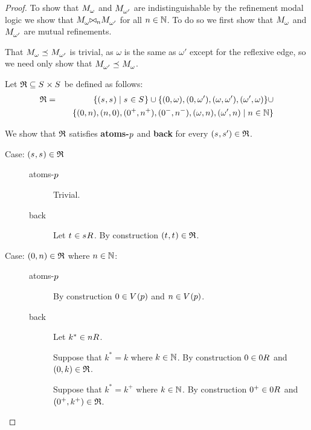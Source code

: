 \begin{proof}
To show that $\kPModel{\omega}$ and $\kPModel{\omega'}$ are indistinguishable by the refinement modal logic we show that $\kPModel{\omega} \bisimref[n] \kPModel{\omega'}$ for all $n \in \mathbb{N}$. To do so we first show that $\kPModel{\omega}$ and $\kPModel{\omega'}$ are mutual refinements.

That $\kPModel{\omega} \refines \kPModel{\omega'}$ is trivial, as $\omega$ is the same as $\omega'$ except for the reflexive edge, so we need only show that $\kPModel{\omega'} \refines \kPModel{\omega}$.

Let $\refinement \subseteq \kStates \times \kStates$ be defined as follows:
\begin{eqnarray*}
\refinement &=& \{(\kStateS, \kStateS) \mid \kStateS \in \kStates\} \cup
    \{(0, \omega), (0, \omega'), (\omega, \omega'), (\omega', \omega)\} \cup  \\&&\quad
    \{(0, n), (n, 0), (0^+, n^+), (0^-, n^-), (\omega, n), (\omega', n) \mid n \in \naturals\}
\end{eqnarray*}

We show that $\mathfrak{R}$ satisfies {\bf atoms-$p$} and {\bf back} for every $(\kStateS, \kStateSP) \in \refinement$.

\begin{description}
    \item[Case: $(\kStateS, \kStateS) \in \refinement$]\hfill
        \begin{description}
            \item[atoms-$p$]
                Trivial.
            \item[back]
                Let $\kStateT \in \kSuccessors{}{\kStateS}$. 
                By construction $(\kStateT, \kStateT) \in \refinement$.
        \end{description}
    \item[Case: $(0, n) \in \mathfrak{R}$ where $n \in \mathbb{N}$:]\hfill
        \begin{description}
            \item[atoms-$p$]
                By construction $0 \in \kValuation(\atomP)$ and $n \in \kValuation(\atomP)$.
            \item[back]
                Let $k^* \in \kSuccessors{}{n}$.

                Suppose that $k^* = k$ where $k \in \mathbb{N}$.
                By construction $0 \in \kSuccessors{}{0}$ and $(0, k) \in \mathfrak{R}$.

                Suppose that $k^* = k^+$ where $k \in \mathbb{N}$.
                By construction $0^+ \in \kSuccessors{}{0}$ and $(0^+, k^+) \in \mathfrak{R}$.


\end{description}
\end{description}
\end{proof}
